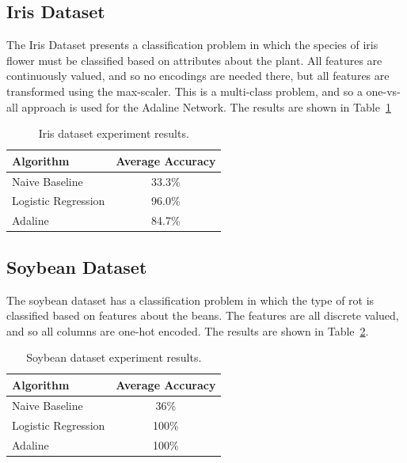 \documentclass{amsart}
\begin{document}
    \subsection{Iris Dataset}
    The Iris Dataset\cite{irisdataset} presents a classification
    problem in which the species of iris flower must be classified based
    on attributes about the plant. All features are continuously
    valued, and so no encodings are needed there, but all features are transformed
    using the max-scaler. This is a multi-class problem, and so
    a one-vs-all approach is used for the Adaline Network. The results are
    shown in Table~\ref{iris_results}
    \begin{table}[H]
    \begin{tabular}{lc}
    Algorithm & Average Accuracy \\
    \hline
    Naive Baseline & 33.3\% \\
    Logistic Regression & 96.0\% \\
    Adaline & 84.7\%
    \end{tabular}
    \label{iris_results}
        \caption{Iris dataset experiment results.}
    \end{table}

    \subsection{Soybean Dataset}
    The soybean dataset\cite{soybeandataset} has a classification
    problem in which the type of rot is classified based on
    features about the beans. The features are all discrete
    valued, and so all columns are one-hot encoded. The results
    are shown in Table~\ref{soybean_results}.
    \begin{table}[H]
    \begin{tabular}{lc}
    Algorithm & Average Accuracy \\
    \hline
    Naive Baseline & 36\% \\
    Logistic Regression & 100\% \\
    Adaline & 100\%
    \end{tabular}
    \label{soybean_results}
    \caption{Soybean dataset experiment results.}
    \end{table}
\end{document}
